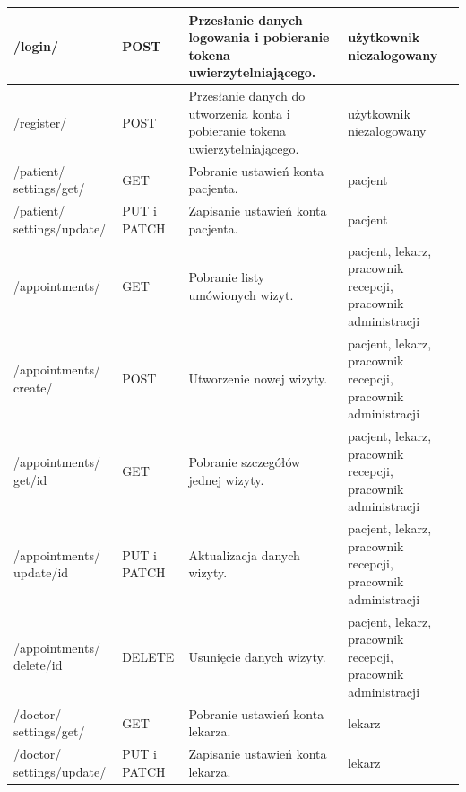 \documentclass[12pt,twoside]{book}
\begin{document}
\begin{longtable}{|>{\raggedright\arraybackslash}p{3cm}|>{\raggedright\arraybackslash}p{2cm}|>{\raggedright\arraybackslash}p{5cm}|>{\raggedright\arraybackslash}p{3.5cm}|}
        /login/                         & POST                           & Przesłanie danych logowania i pobieranie tokena uwierzytelniającego. & użytkownik niezalogowany \\ \hline
        /register/                      & POST                           & Przesłanie danych do utworzenia konta i pobieranie tokena uwierzytelniającego. & użytkownik niezalogowany \\ \hline
        /patient/ settings/get/         & GET                            & Pobranie ustawień konta pacjenta.                                              & pacjent                                                      \\ \hline
        /patient/ settings/update/      & PUT i PATCH                    & Zapisanie ustawień konta pacjenta.                                             & pacjent                                                      \\ \hline
        /appointments/                  & GET                            & Pobranie listy umówionych wizyt.                                               & pacjent, lekarz, pracownik recepcji, pracownik administracji \\ \hline
        /appointments/ create/          & POST                           & Utworzenie nowej wizyty.                                                       & pacjent, lekarz, pracownik recepcji, pracownik administracji \\ \hline
        /appointments/ get/{id}         & GET                            & Pobranie szczegółów jednej wizyty.                                             & pacjent, lekarz, pracownik recepcji, pracownik administracji \\ \hline
        /appointments/ update/{id}      & PUT i PATCH                    & Aktualizacja danych wizyty.                                                    & pacjent, lekarz, pracownik recepcji, pracownik administracji \\ \hline
        /appointments/ delete/{id}      & DELETE                         & Usunięcie danych wizyty.                                                       & pacjent, lekarz, pracownik recepcji, pracownik administracji \\ \hline
        /doctor/ settings/get/          & GET                            & Pobranie ustawień konta lekarza.                                               & lekarz                                                       \\ \hline
        /doctor/ settings/update/       & PUT i PATCH                    & Zapisanie ustawień konta lekarza.                                              & lekarz                                                       \\ \hline

\end{longtable}
\end{document}
